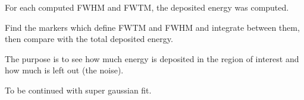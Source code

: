 \documentclass{article}
\begin{document}
For each computed FWHM and FWTM, the deposited energy was computed. 

Find the markers which define FWTM and FWHM and integrate between them, then compare with the total deposited energy.

The purpose is to see how much energy is deposited in the region of interest and how much is left out (the noise).

To be continued with super gaussian fit.

\end{document}

